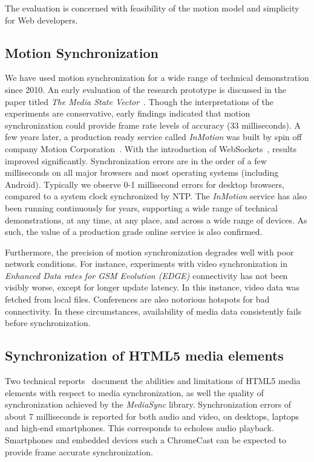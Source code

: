 The evaluation is concerned with feasibility of the motion model and
simplicity for Web developers.


\subsection {Motion Synchronization}

We have used motion synchronization for a wide range of technical
demonstration since 2010. An early evaluation of the research prototype is
discussed in the paper titled \emph{The Media State Vector}~\cite{msv}. Though
the interpretations of the experiments are conservative, early findings
indicated that motion synchronization could provide frame rate levels of
accuracy (33 milliseconds). A few years later, a production ready service
called \emph{InMotion} was built by spin off company Motion
Corporation~\cite{mcorp}. With the introduction of
WebSockets~\cite{websocket}, results improved significantly. Synchronization
errors are in the order of a few milliseconds on all major browsers and most
operating systems (including Android). Typically we observe 0-1 millisecond
errors for desktop browsers, compared to a system clock synchronized by NTP.
The \emph{InMotion} service has also been running continuously for years,
supporting a wide range of technical demonstrations, at any time, at any
place, and across a wide range of devices. As such, the value of a production
grade online service is also confirmed.

Furthermore, the precision of motion synchronization degrades well with poor
network conditions. For instance, experiments with video synchronization in \emph{Enhanced Data rates for GSM Evolution (EDGE)}
connectivity has not been visibly worse, except for longer update
latency. In this instance, video data was fetched from local files.
Conferences are also notorious hotspots for bad connectivity. In these
circumstances, availability of media data consistently fails before
synchronization.


\subsection {Synchronization of HTML5 media elements}

Two technical reports~\cite{syncreport1,syncreport2} document the abilities
and limitations of HTML5 media elements with respect to media synchronization,
as well the quality of synchronization achieved by the \emph{MediaSync}
library. Synchronization errors of about 7 milliseconds is reported for both
audio and video, on desktops, laptops and high-end smartphones. This
corresponds to echoless audio playback. Smartphones and embedded devices such
a ChromeCast can be expected to provide frame accurate synchronization. 

